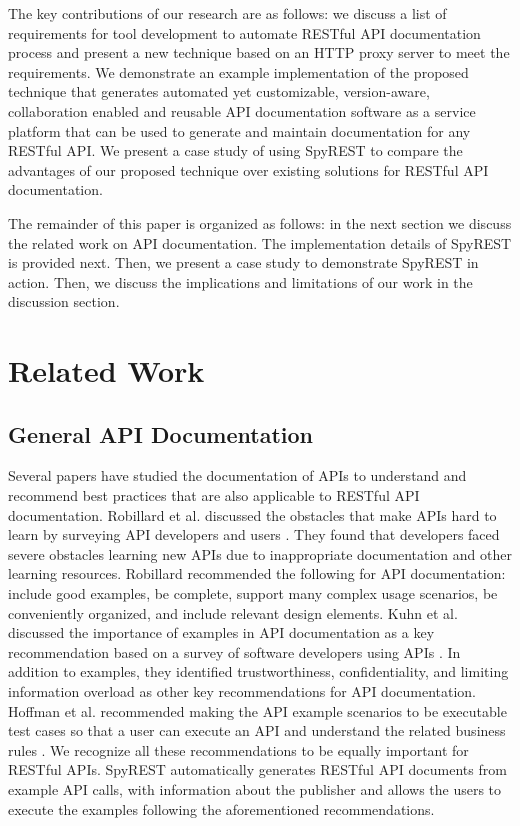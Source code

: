 \documentclass[conference]{IEEEtran}
\begin{document}
The key contributions of our research are as follows: we discuss a list of requirements for tool development to automate RESTful API documentation process and present a new technique based on an HTTP proxy server to meet the requirements. We demonstrate an example implementation of the proposed technique that generates automated yet customizable, version-aware, collaboration enabled and reusable API documentation software as a service platform that can be used to generate and maintain documentation for any RESTful API. We present a case study of using SpyREST to compare the advantages of our proposed technique over existing solutions for RESTful API documentation.

The remainder of this paper is organized as follows: in the next section we discuss the related work on API documentation. The implementation details of SpyREST is provided next. Then, we present a case study to demonstrate SpyREST in action. Then, we discuss the implications and limitations of our work in the discussion section.


\section{Related Work} %
\label{sec:related_work}
\subsection{General API Documentation} %
\label{ssub:api_learnability}
Several papers have studied the documentation of APIs to understand and recommend best practices that are also applicable to RESTful API documentation. Robillard et al. discussed the obstacles that make APIs hard to learn by surveying API developers and users \cite{Robillard_what_makes} \cite{Robillard_a_field_study}. They found that  developers faced severe obstacles learning new APIs due to inappropriate documentation and other learning resources. Robillard recommended the following for API documentation: include good examples, be complete, support many complex usage scenarios, be conveniently organized, and include relevant design elements. Kuhn et al. discussed the importance of examples in API documentation as a key recommendation based on a survey of software developers using APIs \cite{Kuhn_on_designing}. In addition to examples, they identified trustworthiness, confidentiality, and limiting information overload as other key recommendations for API documentation. Hoffman et al. recommended making the API example scenarios to be executable test cases so that a user can execute an API and understand the related business rules \cite{Hoffman_api_documentation}. We recognize all these recommendations to be equally important for RESTful APIs. SpyREST automatically generates RESTful API documents from example API calls, with information about the publisher and allows the users to execute the examples following the aforementioned recommendations.
\end{document}
